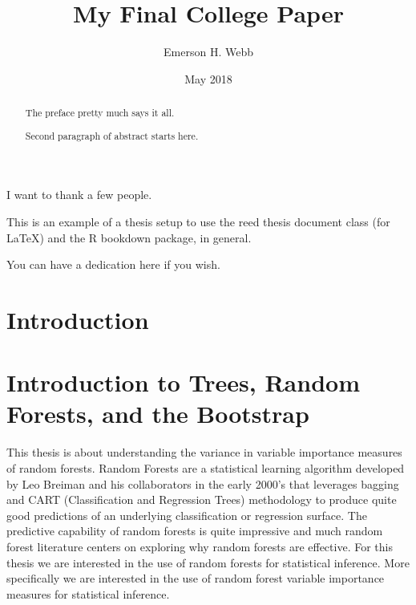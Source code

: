 \documentclass[12pt,twoside]{reedthesis}
\title{My Final College Paper}
\author{Emerson H. Webb}
\date{May 2018}
\theoremstyle{definition}
\theoremstyle{definition}
\theoremstyle{definition}
\theoremstyle{remark}
\begin{document}
  \maketitle

\frontmatter %
\pagestyle{empty} %
  \begin{acknowledgements}
    I want to thank a few people.
  \end{acknowledgements}
  \begin{preface}
    This is an example of a thesis setup to use the reed thesis document
    class (for LaTeX) and the R bookdown package, in general.
  \end{preface}
  \hypersetup{linkcolor=black}
  \setcounter{tocdepth}{2}
  \tableofcontents

  \listoftables

  \listoffigures
  \begin{abstract}
    The preface pretty much says it all. \par
    
    Second paragraph of abstract starts here.
  \end{abstract}
  \begin{dedication}
    You can have a dedication here if you wish.
  \end{dedication}
\mainmatter %
\pagestyle{fancyplain} %

\chapter*{Introduction}\label{introduction}

\chapter{Introduction to Trees, Random Forests, and the
Bootstrap}\label{rmd-basics}

This thesis is about understanding the variance in variable importance
measures of random forests. Random Forests are a statistical learning
algorithm developed by Leo Breiman and his collaborators in the early
2000's that leverages bagging and CART (Classification and Regression
Trees) methodology to produce quite good predictions of an underlying
classification or regression surface. The predictive capability of
random forests is quite impressive and much random forest literature
centers on exploring why random forests are effective. For this thesis
we are interested in the use of random forests for statistical
inference. More specifically we are interested in the use of random
forest variable importance measures for statistical inference.
\end{document}
